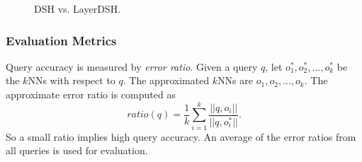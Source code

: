 \begin{figure}[!t]
{    
    \hspace{-5mm}
    }
	\caption{DSH vs. LayerDSH.}
	\label{fig:dshresult}
\vspace{-0.1in}
\end{figure}

\subsubsection{Evaluation Metrics}

 Query accuracy is measured by \emph{error ratio}. Given a query $q$, let $o_1^*,o_2^*,\ldots,o_k^*$ be the $k$NNs with respect to $q$. The approximated $k$NNs are $o_1,o_2,\ldots,o_k$. The approximate error ratio is computed as
\begin{equation}
\label{eq:ratio}
ratio(q)=\frac{1}{k}\sum_{i=1}^k\frac{||q,o_i||}{||q,o_i^*||}.
\end{equation}
So a small ratio implies high query accuracy. An average of the error ratios from all queries is used for evaluation.

